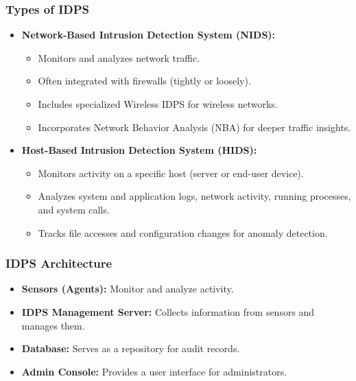 \subsubsection{Types of IDPS}
\begin{itemize}
    \item \textbf{Network-Based Intrusion Detection System (NIDS):}
    \begin{itemize}
        \item Monitors and analyzes network traffic.
        \item Often integrated with firewalls (tightly or loosely).
        \item Includes specialized Wireless IDPS for wireless networks.
        \item Incorporates Network Behavior Analysis (NBA) for deeper traffic insights.
    \end{itemize}
    \item \textbf{Host-Based Intrusion Detection System (HIDS):}
    \begin{itemize}
        \item Monitors activity on a specific host (server or end-user device).
        \item Analyzes system and application logs, network activity, running processes, and system calls.
        \item Tracks file accesses and configuration changes for anomaly detection.
    \end{itemize}
\end{itemize}

\subsubsection{IDPS Architecture}
\begin{itemize}
    \item \textbf{Sensors (Agents):} Monitor and analyze activity.
    \item \textbf{IDPS Management Server:} Collects information from sensors and manages them.
    \item \textbf{Database:} Serves as a repository for audit records.
    \item \textbf{Admin Console:} Provides a user interface for administrators.
\end{itemize}

